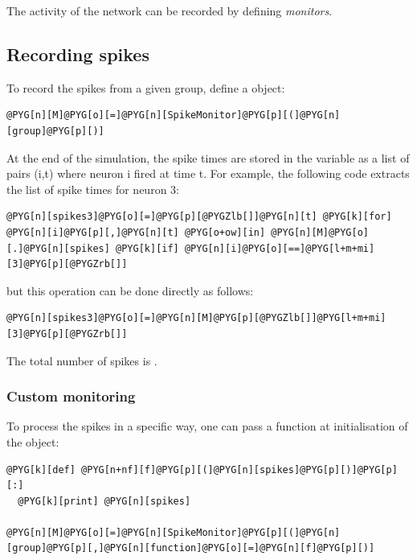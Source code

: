 \documentclass[letterpaper,10pt,english]{manual}
\begin{document}
The activity of the network can be recorded by defining \emph{monitors}.


\subsection{Recording spikes}

To record the spikes from a given group, define a \hyperlink{brian.SpikeMonitor}{} object:

\begin{Verbatim}[commandchars=@\[\]]
@PYG[n][M]@PYG[o][=]@PYG[n][SpikeMonitor]@PYG[p][(]@PYG[n][group]@PYG[p][)]
\end{Verbatim}

At the end of the simulation, the spike times are stored in the variable  as
a list of pairs (i,t) where neuron i fired at time t. For example, the following code extracts
the list of spike times for neuron 3:

\begin{Verbatim}[commandchars=@\[\]]
@PYG[n][spikes3]@PYG[o][=]@PYG[p][@PYGZlb[]]@PYG[n][t] @PYG[k][for] @PYG[n][i]@PYG[p][,]@PYG[n][t] @PYG[o+ow][in] @PYG[n][M]@PYG[o][.]@PYG[n][spikes] @PYG[k][if] @PYG[n][i]@PYG[o][==]@PYG[l+m+mi][3]@PYG[p][@PYGZrb[]]
\end{Verbatim}

but this operation can be done directly as follows:

\begin{Verbatim}[commandchars=@\[\]]
@PYG[n][spikes3]@PYG[o][=]@PYG[n][M]@PYG[p][@PYGZlb[]]@PYG[l+m+mi][3]@PYG[p][@PYGZrb[]]
\end{Verbatim}

The total number of spikes is .


\subsubsection{Custom monitoring}

To process the spikes in a specific way, one can pass a function at initialisation of the
\hyperlink{brian.SpikeMonitor}{} object:

\begin{Verbatim}[commandchars=@\[\]]
@PYG[k][def] @PYG[n+nf][f]@PYG[p][(]@PYG[n][spikes]@PYG[p][)]@PYG[p][:]
  @PYG[k][print] @PYG[n][spikes]

@PYG[n][M]@PYG[o][=]@PYG[n][SpikeMonitor]@PYG[p][(]@PYG[n][group]@PYG[p][,]@PYG[n][function]@PYG[o][=]@PYG[n][f]@PYG[p][)]
\end{Verbatim}
\end{document}
